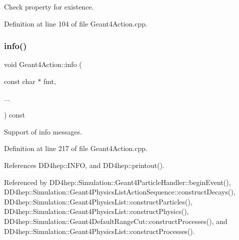 Check property for existence. 



Definition at line 104 of file Geant4\+Action.\+cpp.

\hypertarget{class_d_d4hep_1_1_simulation_1_1_geant4_action_ad458cc4957a876c0cbbc9ad6354fc187}{}\label{class_d_d4hep_1_1_simulation_1_1_geant4_action_ad458cc4957a876c0cbbc9ad6354fc187} 
\subsubsection{\texorpdfstring{info()}{info()}}
{\footnotesize\ttfamily void Geant4\+Action\+::info (\begin{DoxyParamCaption}\item[{const char $\ast$}]{fmt,  }\item[{}]{... }\end{DoxyParamCaption}) const}



Support of info messages. 



Definition at line 217 of file Geant4\+Action.\+cpp.



References D\+D4hep\+::\+I\+N\+FO, and D\+D4hep\+::printout().



Referenced by D\+D4hep\+::\+Simulation\+::\+Geant4\+Particle\+Handler\+::begin\+Event(), D\+D4hep\+::\+Simulation\+::\+Geant4\+Physics\+List\+Action\+Sequence\+::construct\+Decays(), D\+D4hep\+::\+Simulation\+::\+Geant4\+Physics\+List\+::construct\+Particles(), D\+D4hep\+::\+Simulation\+::\+Geant4\+Physics\+List\+::construct\+Physics(), D\+D4hep\+::\+Simulation\+::\+Geant4\+Default\+Range\+Cut\+::construct\+Processes(), and D\+D4hep\+::\+Simulation\+::\+Geant4\+Physics\+List\+::construct\+Processes().

\hypertarget{class_d_d4hep_1_1_simulation_1_1_geant4_action_aaaa0718b7d4f52e4c31e982b91c0eeda}{}\label{class_d_d4hep_1_1_simulation_1_1_geant4_action_aaaa0718b7d4f52e4c31e982b91c0eeda} 
